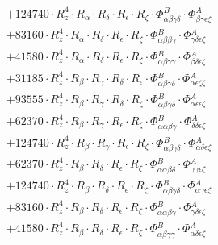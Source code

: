 \documentclass{article}
\begin{document}
\begin{subequations}
\begin{gather}
\begin{array}{c}
 \\[0.2em] 		 + 124740 \cdot R_{z}^{4} \cdot R_{\alpha{}} \cdot R_{\delta{}} \cdot R_{\epsilon{}} \cdot R_{\zeta{}} \cdot \Phi{}^{B}_{\alpha{}\beta{}\gamma{}\delta{}} \cdot \Phi{}^{A}_{\beta{}\gamma{}\epsilon{}\zeta{}} 
 \\[0.2em] 		 + 83160 \cdot R_{z}^{4} \cdot R_{\alpha{}} \cdot R_{\delta{}} \cdot R_{\epsilon{}} \cdot R_{\zeta{}} \cdot \Phi{}^{B}_{\alpha{}\beta{}\beta{}\gamma{}} \cdot \Phi{}^{A}_{\gamma{}\delta{}\epsilon{}\zeta{}} 
 \\[0.2em] 		 + 41580 \cdot R_{z}^{4} \cdot R_{\alpha{}} \cdot R_{\delta{}} \cdot R_{\epsilon{}} \cdot R_{\zeta{}} \cdot \Phi{}^{B}_{\alpha{}\beta{}\gamma{}\gamma{}} \cdot \Phi{}^{A}_{\beta{}\delta{}\epsilon{}\zeta{}} 
 \\[0.2em] 		 + 31185 \cdot R_{z}^{4} \cdot R_{\beta{}} \cdot R_{\gamma{}} \cdot R_{\delta{}} \cdot R_{\epsilon{}} \cdot \Phi{}^{B}_{\alpha{}\beta{}\gamma{}\delta{}} \cdot \Phi{}^{A}_{\alpha{}\epsilon{}\zeta{}\zeta{}} 
 \\[0.2em] 		 + 93555 \cdot R_{z}^{4} \cdot R_{\beta{}} \cdot R_{\gamma{}} \cdot R_{\delta{}} \cdot R_{\zeta{}} \cdot \Phi{}^{B}_{\alpha{}\beta{}\gamma{}\delta{}} \cdot \Phi{}^{A}_{\alpha{}\epsilon{}\epsilon{}\zeta{}} 
 \\[0.2em] 		 + 62370 \cdot R_{z}^{4} \cdot R_{\beta{}} \cdot R_{\gamma{}} \cdot R_{\epsilon{}} \cdot R_{\zeta{}} \cdot \Phi{}^{B}_{\alpha{}\alpha{}\beta{}\gamma{}} \cdot \Phi{}^{A}_{\delta{}\delta{}\epsilon{}\zeta{}} 
 \\[0.2em] 		 + 124740 \cdot R_{z}^{4} \cdot R_{\beta{}} \cdot R_{\gamma{}} \cdot R_{\epsilon{}} \cdot R_{\zeta{}} \cdot \Phi{}^{B}_{\alpha{}\beta{}\gamma{}\delta{}} \cdot \Phi{}^{A}_{\alpha{}\delta{}\epsilon{}\zeta{}} 
 \\[0.2em] 		 + 62370 \cdot R_{z}^{4} \cdot R_{\beta{}} \cdot R_{\delta{}} \cdot R_{\epsilon{}} \cdot R_{\zeta{}} \cdot \Phi{}^{B}_{\alpha{}\alpha{}\beta{}\delta{}} \cdot \Phi{}^{A}_{\gamma{}\gamma{}\epsilon{}\zeta{}} 
 \\[0.2em] 		 + 124740 \cdot R_{z}^{4} \cdot R_{\beta{}} \cdot R_{\delta{}} \cdot R_{\epsilon{}} \cdot R_{\zeta{}} \cdot \Phi{}^{B}_{\alpha{}\beta{}\gamma{}\delta{}} \cdot \Phi{}^{A}_{\alpha{}\gamma{}\epsilon{}\zeta{}} 
 \\[0.2em] 		 + 83160 \cdot R_{z}^{4} \cdot R_{\beta{}} \cdot R_{\delta{}} \cdot R_{\epsilon{}} \cdot R_{\zeta{}} \cdot \Phi{}^{B}_{\alpha{}\alpha{}\beta{}\gamma{}} \cdot \Phi{}^{A}_{\gamma{}\delta{}\epsilon{}\zeta{}} 
 \\[0.2em] 		 + 41580 \cdot R_{z}^{4} \cdot R_{\beta{}} \cdot R_{\delta{}} \cdot R_{\epsilon{}} \cdot R_{\zeta{}} \cdot \Phi{}^{B}_{\alpha{}\beta{}\gamma{}\gamma{}} \cdot \Phi{}^{A}_{\alpha{}\delta{}\epsilon{}\zeta{}} 

\end{array}
\end{gather}
\end{subequations}
\end{document}
